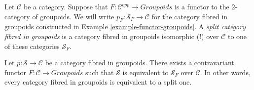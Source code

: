 \begin{definition}
\label{definition-split-category-fibred-in-groupoids}
Let $\mathcal{C}$ be a category.
Suppose that $F : \mathcal{C}^{opp} \to \textit{Groupoids}$ is a functor
to the $2$-category of groupoids.
We will write $p_F : \mathcal{S}_F \to \mathcal{C}$ for the
category fibred in groupoids constructed in
Example \ref{example-functor-groupoids}.
A {\it split category fibred in groupoids} is a
category fibred in groupoids isomorphic (!)
over $\mathcal{C}$ to one of these categories {\it $\mathcal{S}_F$}.
\end{definition}

\begin{lemma}
\label{lemma-fibred-groupoids-strict}
Let $ p : \mathcal{S} \to \mathcal{C}$ be a category fibred in groupoids.
There exists a contravariant functor $F : \mathcal{C} \to \textit{Groupoids}$
such that $\mathcal{S}$ is equivalent to $\mathcal{S}_F$ over $\mathcal{C}$.
In other words, every category fibred in groupoids is equivalent to a split one.
\end{lemma}

